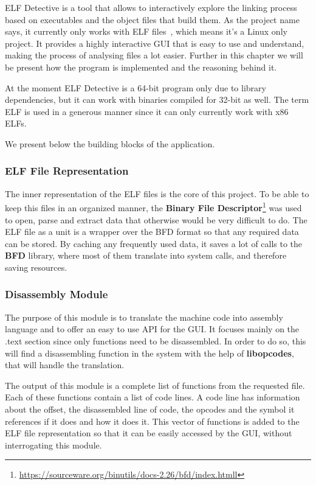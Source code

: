 ELF Detective is a tool that allows to interactively explore the linking process based on executables and the object files that build them. As the project name says, it currently only works with ELF files~\cite{elf-url}, which means it's a Linux only project. It provides a highly interactive GUI that is easy to use and understand, making the process of analysing files a lot easier. Further in this chapter we will be present how the program is implemented and the reasoning behind it.

At the moment ELF Detective is a 64-{}bit program only due to library dependencies, but it can work with binaries compiled for 32-{}bit as well. The term ELF is used in a generous manner since it can only currently work with x86 ELFs.

We present below the building blocks of the application.

\subsubsection{ELF File Representation}
\label{sub-sec:elf-rep}

The inner representation of the ELF files is the core of this project. To be able to keep this files in an organized manner, the \textbf{Binary File Descriptor}\footnote{\url{https://sourceware.org/binutils/docs-2.26/bfd/index.htmll}} was used to open, parse and extract data that otherwise would be very difficult to do. The ELF file as a unit is a wrapper over the BFD format so that any required data can be stored. By caching any frequently used data, it saves a lot of calls to the \textbf{BFD} library, where most of them translate into system calls, and therefore saving resources. 

\subsubsection{Disassembly Module}
\label{sub-sec:dis-mod}

The purpose of this module is to translate the machine code into assembly language and to offer an easy to use API for the GUI. It focuses mainly on the .text section since only functions need to be disassembled. In order to do so, this will find a disassembling function in the system with the help of \textbf{libopcodes}, that will handle the translation.

The output of this module is a complete list of functions from the requested file. Each of these functions contain a list of code lines. A code line has information about the offset, the disassembled line of code, the opcodes and the symbol it references if it does and how it does it. This vector of functions is added to the ELF file representation so that it can be easily accessed by the GUI, without interrogating this module.

